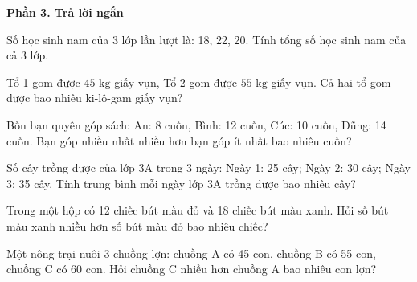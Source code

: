 \textbf{Phần 3. Trả lời ngắn}

\begin{ex} %
Số học sinh nam của 3 lớp lần lượt là: 18, 22, 20. Tính tổng số học sinh nam của cả 3 lớp.
\end{ex}

\begin{ex} %
Tổ 1 gom được $45\text{ kg}$ giấy vụn, Tổ 2 gom được $55\text{ kg}$ giấy vụn. Cả hai tổ gom được bao nhiêu ki-lô-gam giấy vụn?
\end{ex}

\begin{ex} %
Bốn bạn quyên góp sách: An: 8 cuốn, Bình: 12 cuốn, Cúc: 10 cuốn, Dũng: 14 cuốn. Bạn góp nhiều nhất nhiều hơn bạn góp ít nhất bao nhiêu cuốn?
\end{ex}

\begin{ex} %
Số cây trồng được của lớp 3A trong 3 ngày: Ngày 1: 25 cây; Ngày 2: 30 cây; Ngày 3: 35 cây. Tính trung bình mỗi ngày lớp 3A trồng được bao nhiêu cây?
\end{ex}

\begin{ex} %
Trong một hộp có 12 chiếc bút màu đỏ và 18 chiếc bút màu xanh. Hỏi số bút màu xanh nhiều hơn số bút màu đỏ bao nhiêu chiếc?
\end{ex}

\begin{ex} %
Một nông trại nuôi 3 chuồng lợn: chuồng A có 45 con, chuồng B có 55 con, chuồng C có 60 con. Hỏi chuồng C nhiều hơn chuồng A bao nhiêu con lợn?
\end{ex}
